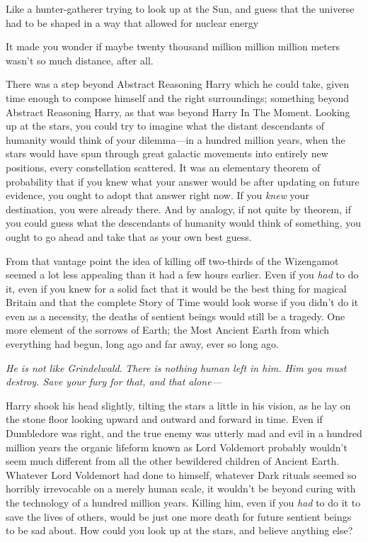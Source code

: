 Like a hunter-gatherer trying to look up at the Sun, and guess that the
universe had to be shaped in a way that allowed for nuclear energy{\el}

It made you wonder if maybe twenty thousand million million million meters
wasn't so much distance, after all.

There was a step beyond Abstract Reasoning Harry which he could take, given
time enough to compose himself and the right surroundings; something beyond
Abstract Reasoning Harry, as that was beyond Harry In The Moment. Looking up at
the stars, you could try to imagine what the distant descendants of humanity
would think of your dilemma—in a hundred million years, when the stars would
have spun through great galactic movements into entirely new positions, every
constellation scattered. It was an elementary theorem of probability that if
you knew what your answer would be after updating on future evidence, you ought
to adopt that answer right now. If you \emph{knew} your destination, you were
already there. And by analogy, if not quite by theorem, if you could guess what
the descendants of humanity would think of something, you ought to go ahead and
take that as your own best guess.

From that vantage point the idea of killing off two-thirds of the Wizengamot
seemed a lot less appealing than it had a few hours earlier. Even if you
\emph{had} to do it, even if you knew for a solid fact that it would be the
best thing for magical Britain and that the complete Story of Time would look
worse if you didn't do it{\el} even as a necessity, the deaths of sentient
beings would still be a tragedy. One more element of the sorrows of Earth; the
Most Ancient Earth from which everything had begun, long ago and far away, ever
so long ago.

\emph{He is not like Grindelwald}. \emph{There is nothing human left in him.
Him you must destroy. Save your fury for that, and that alone—}

Harry shook his head slightly, tilting the stars a little in his vision, as he
lay on the stone floor looking upward and outward and forward in time. Even if
Dumbledore was right, and the true enemy was utterly mad and evil{\el} in a
hundred million years the organic lifeform known as Lord Voldemort probably
wouldn't seem much different from all the other bewildered children of Ancient
Earth. Whatever Lord Voldemort had done to himself, whatever Dark rituals
seemed so horribly irrevocable on a merely human scale, it wouldn't be beyond
curing with the technology of a hundred million years. Killing him, even if you
\emph{had} to do it to save the lives of others, would be just one more death
for future sentient beings to be sad about. How could you look up at the stars,
and believe anything else?

